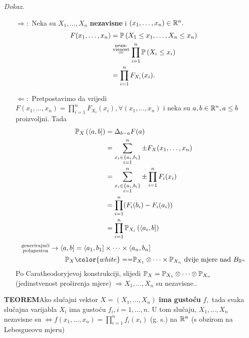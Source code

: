 \documentclass{article}
\begin{document}
\textit{Dokaz.}\newline
\begin{itemize}
    \item[\(\boxed{\Rightarrow}:\)] Neka su \(X_1,\ldots,X_n\) \textbf{nezavisne} i \((x_1,\ldots,x_n)\in\Bbb R^n.\) \[\begin{aligned}F(x_1,\ldots,x_n)&=\Bbb P\left(X_1\le x_1,\ldots, X_n\le x_n\right)\\&\overset{\substack{\text{neza-}\\\text{visnost}}}{=}\prod_{i=1}^n\Bbb P\left(X_i\le x_i\right)\\&=\prod_{i=1}^nF_{X_i}(x_i).\end{aligned}\]
    \item[\(\boxed{\Leftarrow}:\)] Pretpostavimo da vrijedi \(F(x_1,\ldots,x_n)=\prod_{i=1}^nF_{X_i}(x_i),\forall (x_1,\ldots,x_n)\) i neka su \(a,b\in\Bbb R^n,a\le b\) proizvoljni. Tada \[\begin{aligned}\Bbb P_X\left(\langle a,b]\right)&=\Delta_{b-a}F(a)\\&=\sum_{\substack{x_i\in\{a_i,b_i\}\\i=1}}^n\pm F_X(x_1,\ldots,x_n)\\&=\sum_{\substack{x_i\in\{a_i,b_i\}\\i=1}}^n\pm\prod_{i=1}^nF_i(x_i)\\&=\prod_{i=1}^n(F_i(b_i)-F_i(a_i))\\&=\prod_{i=1}^n\Bbb P_{X_i}\left(\langle a_i,b]\right)\end{aligned}\]
    \[\begin{aligned}\substack{\text{generirajući}\\\text{poluprsten}}\to\langle a,b]&=\langle a_1,b_1]\times\cdots\times\langle a_n,b_n]\\\Bbb P_X&{\color{white}==}\Bbb P_{X_1}\otimes\cdots\times\Bbb P_{X_n}\text{ dvije mjere nad }B_{\Bbb R^n}\end{aligned}\] Po Caratheodoryjevoj konstrukciji, slijedi \(\Bbb P_X=\Bbb P_{X_1}\otimes\cdots\otimes\Bbb P_{X_n}\) (jedinstvenost proširenja mjere) \(\Rightarrow X_1,\ldots,X_n\) su nezavisne..
\end{itemize}
\textbf{TEOREM}\newline Ako slučajni vektor \(X=(X_1,\ldots,X_n)\) \textbf{ima gustoću} \(f,\) tada svaka slučajna varijabla \(X_i\) ima gustoću \(f_i,i=1,\ldots,n.\) U tom slučaju,  \(X_1,\ldots,X_n\) nezavisne su \(\Leftrightarrow f(x_1,\ldots,x_n)=\prod_{i=1}^nf_i(x_i)\) (g. s.) na \(\Bbb R^n\) (s obzirom na Lebesgueovu mjeru)\newline
\end{document}

